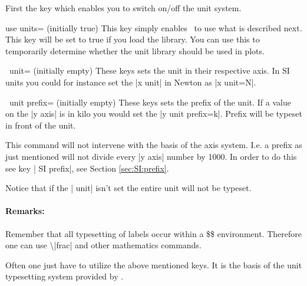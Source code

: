 First the key which enables you to switch on/off the unit system.
\begin{pgfplotskey}{use units= (initially true)}
  This key simply enables \PGFPlots\ to use what is described next. This key will be set to true if you load the library. You can use this to temporarily
  determine whether the unit library should be used in plots.
\end{pgfplotskey}
\begin{pgfplotsxykey}{\x\ unit= (initially empty)}
  These keys sets the unit in their respective axis. In SI units you could for instance set the |x unit| in Newton as |x unit=N|.
\end{pgfplotsxykey}
\begin{pgfplotsxykey}{\x\ unit prefix= (initially empty)}
  These keys sets the prefix of the unit. If a value on the |y axis| is in kilo you would set the |y unit prefix=k|. Prefix will be typeset in front of the unit.

  This command will not intervene with the basis of the axis system. I.e. a prefix as just mentioned will not divide every |y axis| number by 1000. 
  In order to do this see key | SI prefix|, see Section \ref{sec:SI:prefix}.
  
  Notice that if the | unit| isn't set the entire unit will not be typeset.
  
  \paragraph{Remarks:} Remember that all typesetting of labels occur within a \$\$ environment. Therefore one can use \textbackslash|frac|
  and other mathematics commands.
\end{pgfplotsxykey}
Often one just have to utilize the above mentioned keys. It is the basis of the unit typesetting system provided by \PGFPlots.
\begin{codeexample}[]
\end{codeexample}

